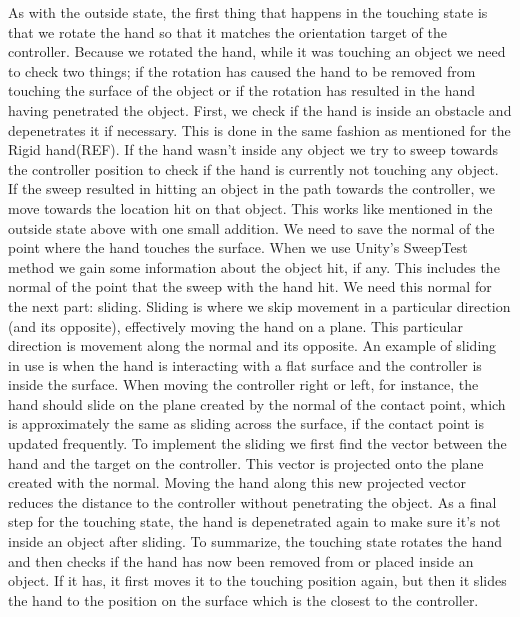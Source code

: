 As with the outside state, the first thing that happens in the touching state is that we rotate the hand so that it matches the orientation target of the controller. Because we rotated the hand, while it was touching an object we need to check two things; if the rotation has caused the hand to be removed from touching the surface of the object or if the rotation has resulted in the hand having penetrated the object. First, we check if the hand is inside an obstacle and depenetrates it if necessary. This is done in the same fashion as mentioned for the Rigid hand(REF). If the hand wasn't inside any object we try to sweep towards the controller position to check if the hand is currently not touching any object. If the sweep resulted in hitting an object in the path towards the controller, we move towards the location hit on that object. This works like mentioned in the outside state above with one small addition. We need to save the normal of the point where the hand touches the surface. When we use Unity's SweepTest method we gain some information about the object hit, if any. This includes the normal of the point that the sweep with the hand hit. We need this normal for the next part: sliding. Sliding is where we skip movement in a particular direction (and its opposite), effectively moving the hand on a plane. This particular direction is movement along the normal and its opposite. An example of sliding in use is when the hand is interacting with a flat surface and the controller is inside the surface. When moving the controller right or left, for instance, the hand should slide on the plane created by the normal of the contact point, which is approximately the same as sliding across the surface, if the contact point is updated frequently. To implement the sliding we first find the vector between the hand and the target on the controller. This vector is projected onto the plane created with the normal. Moving the hand along this new projected vector reduces the distance to the controller without penetrating the object. As a final step for the touching state, the hand is depenetrated again to make sure it's not inside an object after sliding. To summarize, the touching state rotates the hand and then checks if the hand has now been removed from or placed inside an object. If it has, it first moves it to the touching position again, but then it slides the hand to the position on the surface which is the closest to the controller.


